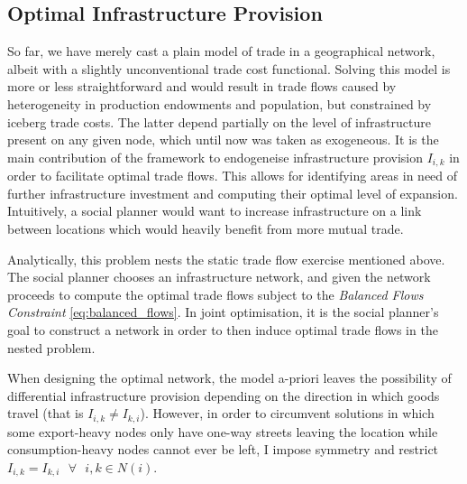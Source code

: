\documentclass[11pt, oneside]{article}   	%
\begin{document}
\subsection{Optimal Infrastructure Provision}
So far, we have merely cast a plain model of trade in a geographical network, albeit with a slightly unconventional trade cost functional. Solving this model is more or less straightforward and would result in trade flows caused by heterogeneity in production endowments and population, but constrained by iceberg trade costs. The latter depend partially on the level of infrastructure present on any given node, which until now was taken as exogeneous. It is the main contribution of the \cite{fajgelbaum_optimal_2017} framework to endogeneise infrastructure provision $I_{i,k}$ in order to facilitate optimal trade flows. This allows for identifying areas in need of further infrastructure investment and computing their optimal level of expansion. Intuitively, a social planner would want to increase infrastructure on a link between locations which would heavily benefit from more mutual trade.

Analytically, this problem nests the static trade flow exercise mentioned above. The social planner chooses an infrastructure network, and given the network proceeds to compute the optimal trade flows subject to the \emph{Balanced Flows Constraint} \eqref{eq:balanced_flows}. In joint optimisation, it is the social planner's goal to construct a network in order to then induce optimal trade flows in the nested problem.

When designing the optimal network, the model a-priori leaves the possibility of differential infrastructure provision depending on the direction in which goods travel (that is $I_{i,k} \neq I_{k,i}$). However, in order to circumvent solutions in which some export-heavy nodes only have one-way streets leaving the location while consumption-heavy nodes cannot ever be left, I impose symmetry and restrict $I_{i,k} = I_{k,i} \textrm{ } \forall \textrm{ } i,k\in N(i)$.
\end{document}
